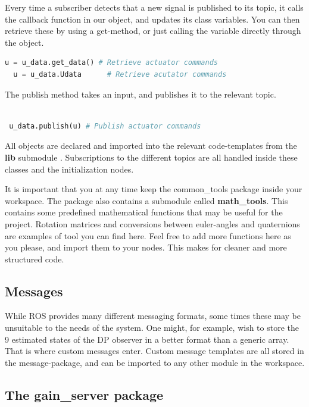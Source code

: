 Every time a subscriber detects that a new signal is published to its topic, it calls the callback function in our  object, and updates its class variables. You can then retrieve these by using a get-method, or just calling the variable directly through the object.

\begin{lstlisting}[language=python]
  u = u_data.get_data() # Retrieve actuator commands 
  u = u_data.Udata      # Retrieve acutator commands
\end{lstlisting}

The publish method takes an input, and publishes it to the relevant topic.


\begin{lstlisting}[language=python]

 u_data.publish(u) # Publish actuator commands 
\end{lstlisting}

All objects are declared and imported into the relevant code-templates from the \textbf{lib} submodule . Subscriptions to the different topics are all handled inside these classes and the initialization nodes.

It is important that you at any time keep the common\_tools package inside your workspace. The package also contains a submodule called \textbf{math\_tools}. This contains some predefined mathematical functions that may be useful for the project. Rotation matrices and conversions between euler-angles and quaternions are examples of tool you can find here. Feel free to add more functions here as you please, and import them to your nodes. This makes for cleaner and more structured code. 

\subsection{Messages}

While ROS provides many different messaging formats, some times these may be unsuitable to the needs of the system. One might, for example, wish to store the 9 estimated states of the DP observer in a better format than a generic array. That is where custom messages enter. Custom message templates are all stored in the message-package, and can be imported to any other module in the workspace. 

\subsection{The gain\_server package}

